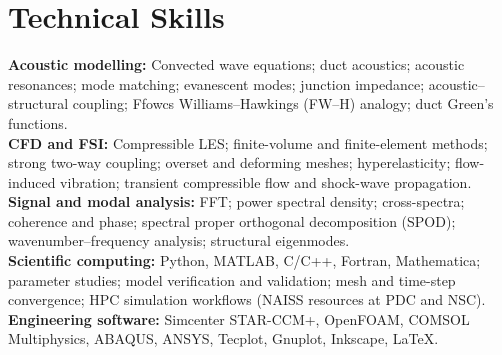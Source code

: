 \documentclass[a4paper,10pt]{article}
\begin{document}
\section{Technical Skills}
\textbf{Acoustic modelling:} Convected wave equations; duct acoustics; acoustic resonances;
mode matching; evanescent modes; junction impedance; acoustic--structural coupling;
Ffowcs Williams--Hawkings (FW--H) analogy; duct Green's functions.\\[3pt]
\textbf{CFD and FSI:} Compressible LES; finite-volume and finite-element methods;
strong two-way coupling; overset and deforming meshes; hyperelasticity;
flow-induced vibration; transient compressible flow and shock-wave propagation.\\[3pt]
\textbf{Signal and modal analysis:} FFT; power spectral density; cross-spectra;
coherence and phase; spectral proper orthogonal decomposition (SPOD);
wavenumber--frequency analysis; structural eigenmodes.\\[3pt]
\textbf{Scientific computing:} Python, MATLAB, C/C++, Fortran, Mathematica;
parameter studies; model verification and validation; mesh and time-step convergence;
HPC simulation workflows (NAISS resources at PDC and NSC).\\[3pt]
\textbf{Engineering software:} Simcenter STAR-CCM+, OpenFOAM, COMSOL Multiphysics,
ABAQUS, ANSYS, Tecplot, Gnuplot, Inkscape, LaTeX.
\end{document}
